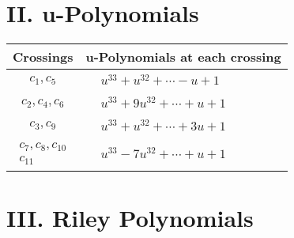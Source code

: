 \documentclass[1p]{elsarticle_modified}
\theoremstyle{definition}
\begin{document}
\newpage\renewcommand{\arraystretch}{1}
\centering \section*{ II. u-Polynomials}
\begin{tabular}{m{50pt}|m{274pt}}
Crossings & \hspace{64pt}u-Polynomials at each crossing \\
\hline $$\begin{aligned}c_{1},c_{5}\end{aligned}$$&$\begin{aligned}
&u^{33}+u^{32}+\cdots- u+1
\end{aligned}$\\
\hline $$\begin{aligned}c_{2},c_{4},c_{6}\end{aligned}$$&$\begin{aligned}
&u^{33}+9 u^{32}+\cdots+u+1
\end{aligned}$\\
\hline $$\begin{aligned}c_{3},c_{9}\end{aligned}$$&$\begin{aligned}
&u^{33}+u^{32}+\cdots+3 u+1
\end{aligned}$\\
\hline $$\begin{aligned}c_{7},c_{8},c_{10}\\c_{11}\end{aligned}$$&$\begin{aligned}
&u^{33}-7 u^{32}+\cdots+u+1
\end{aligned}$\\
\hline
\end{tabular}\newpage\renewcommand{\arraystretch}{1}
\centering \section*{ III. Riley Polynomials}
\end{document}
